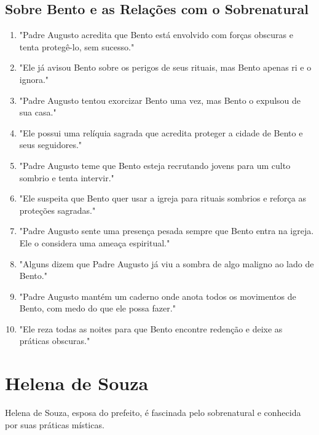 \subsection*{Sobre Bento e as Relações com o Sobrenatural}
\begin{enumerate}
    \item "Padre Augusto acredita que Bento está envolvido com forças obscuras e tenta protegê-lo, sem sucesso."
    \item "Ele já avisou Bento sobre os perigos de seus rituais, mas Bento apenas ri e o ignora."
    \item "Padre Augusto tentou exorcizar Bento uma vez, mas Bento o expulsou de sua casa."
    \item "Ele possui uma relíquia sagrada que acredita proteger a cidade de Bento e seus seguidores."
    \item "Padre Augusto teme que Bento esteja recrutando jovens para um culto sombrio e tenta intervir."
    \item "Ele suspeita que Bento quer usar a igreja para rituais sombrios e reforça as proteções sagradas."
    \item "Padre Augusto sente uma presença pesada sempre que Bento entra na igreja. Ele o considera uma ameaça espiritual."
    \item "Alguns dizem que Padre Augusto já viu a sombra de algo maligno ao lado de Bento."
    \item "Padre Augusto mantém um caderno onde anota todos os movimentos de Bento, com medo do que ele possa fazer."
    \item "Ele reza todas as noites para que Bento encontre redenção e deixe as práticas obscuras."
\end{enumerate}

\section{Helena de Souza}
Helena de Souza, esposa do prefeito, é fascinada pelo sobrenatural e conhecida por suas práticas místicas.

